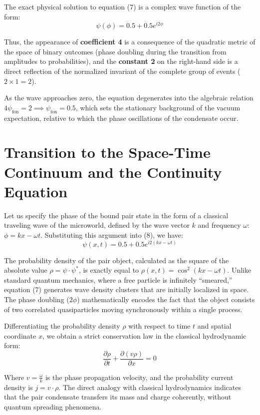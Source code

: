 \documentclass{article}
\begin{document}
The exact physical solution to equation (7) is a complex wave function of the form:
\begin{equation}
\psi(\phi) = 0.5 + 0.5e^{i2\phi}
\end{equation}

Thus, the appearance of \textbf{coefficient 4} is a consequence of the quadratic metric of the space of binary outcomes (phase doubling during the transition from amplitudes to probabilities), and the \textbf{constant 2} on the right-hand side is a direct reflection of the normalized invariant of the complete group of events ($2 \times 1 = 2$).

As the wave approaches zero, the equation degenerates into the algebraic relation $4\psi_{\text{fon}} = 2 \implies \psi_{\text{fon}} = 0.5$, which sets the stationary background of the vacuum expectation, relative to which the phase oscillations of the condensate occur.

\section{Transition to the Space-Time Continuum and the Continuity Equation}
Let us specify the phase of the bound pair state in the form of a classical traveling wave of the microworld, defined by the wave vector $k$ and frequency $\omega$: $\phi = kx - \omega t$. Substituting this argument into (8), we have:
\begin{equation}
\psi(x, t) = 0.5 + 0.5e^{i2(kx-\omega t)}
\end{equation}

The probability density of the pair object, calculated as the square of the absolute value $\rho = \psi \cdot \psi^*$, is exactly equal to $\rho(x, t) = \cos^2(kx - \omega t)$. Unlike standard quantum mechanics, where a free particle is infinitely ``smeared,'' equation (7) generates wave density clusters that are initially localized in space. The phase doubling ($2\phi$) mathematically encodes the fact that the object consists of two correlated quasiparticles moving synchronously within a single process.

Differentiating the probability density $\rho$ with respect to time $t$ and spatial coordinate $x$, we obtain a strict conservation law in the classical hydrodynamic form:
\begin{equation}
\frac{\partial \rho}{\partial t} + \frac{\partial(v\rho)}{\partial x} = 0
\end{equation}

Where $v = \frac{\omega}{k}$ is the phase propagation velocity, and the probability current density is $j = v \cdot \rho$. The direct analogy with classical hydrodynamics indicates that the pair condensate transfers its mass and charge coherently, without quantum spreading phenomena.
\end{document}
